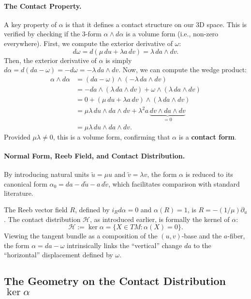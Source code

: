 \paragraph{The Contact Property.}
A key property of $\alpha$ is that it defines a contact structure on our 3D space. This is verified by checking if the 3-form $\alpha \wedge d\alpha$ is a volume form (i.e., non-zero everywhere). First, we compute the exterior derivative of $\omega$:
\[
d\omega = d(\mu\,du + \lambda a\,dv) = \lambda\,da \wedge dv.
\]
Then, the exterior derivative of $\alpha$ is simply $d\alpha = d(da - \omega) = -d\omega = -\lambda\,da \wedge dv$. Now, we can compute the wedge product:
\begin{align*}
\alpha \wedge d\alpha &= (da - \omega) \wedge (-\lambda\,da \wedge dv) \\
&= -da \wedge (\lambda\,da \wedge dv) + \omega \wedge (\lambda\,da \wedge dv) \\
&= 0 + (\mu\,du + \lambda a\,dv) \wedge (\lambda\,da \wedge dv) \\
&= \mu\lambda\,du \wedge da \wedge dv + \lambda^2 a\,\underbrace{dv \wedge da \wedge dv}_{=0} \\
&= \mu\lambda\,du \wedge da \wedge dv.
\end{align*}
Provided $\mu\lambda \neq 0$, this is a volume form, confirming that $\alpha$ is a \textbf{contact form}.

\paragraph{Normal Form, Reeb Field, and Contact Distribution.}
By introducing natural units $\tilde{u} = \mu u$ and $\tilde{v} = \lambda v$, the form $\alpha$ is reduced to its canonical form $\alpha_0 = da - d\tilde{u} - a\,d\tilde{v}$, which facilitates comparison with standard literature.

The Reeb vector field $R$, defined by $i_R d\alpha = 0$ and $\alpha(R) = 1$, is $R = -(1/\mu)\partial_u$. The contact distribution $\mathcal{H}$, as introduced earlier, is formally the kernel of $\alpha$:
\[
\mathcal{H} := \ker\alpha = \{X \in TM : \alpha(X) = 0\}.
\]
Viewing the tangent bundle as a composition of the $(u,v)$-base and the $a$-fiber, the form $\alpha = da - \omega$ intrinsically links the ``vertical'' change $da$ to the ``horizontal'' displacement defined by $\omega$.

\subsection{The Geometry on the Contact Distribution \texorpdfstring{$\ker\alpha$}{ker(alpha)}} %
\label{subsec:geometry_on_ker_alpha}

